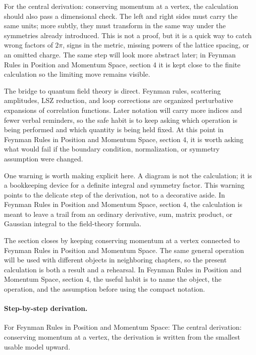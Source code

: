 For the central derivation: conserving momentum at a vertex, the calculation should also pass a dimensional check.  The left and right sides must carry the same units; more subtly, they must transform in the same way under the symmetries already introduced.  This is not a proof, but it is a quick way to catch wrong factors of \(2\pi\), signs in the metric, missing powers of the lattice spacing, or an omitted charge.  The same step will look more abstract later; in Feynman Rules in Position and Momentum Space, section 4 it is kept close to the finite calculation so the limiting move remains visible.

The bridge to quantum field theory is direct.  Feynman rules, scattering amplitudes, LSZ reduction, and loop corrections are organized perturbative expansions of correlation functions.  Later notation will carry more indices and fewer verbal reminders, so the safe habit is to keep asking which operation is being performed and which quantity is being held fixed.  At this point in Feynman Rules in Position and Momentum Space, section 4, it is worth asking what would fail if the boundary condition, normalization, or symmetry assumption were changed.

One warning is worth making explicit here.  A diagram is not the calculation; it is a bookkeeping device for a definite integral and symmetry factor.  This warning points to the delicate step of the derivation, not to a decorative aside.  In Feynman Rules in Position and Momentum Space, section 4, the calculation is meant to leave a trail from an ordinary derivative, sum, matrix product, or Gaussian integral to the field-theory formula.

The section closes by keeping conserving momentum at a vertex connected to Feynman Rules in Position and Momentum Space.  The same general operation will be used with different objects in neighboring chapters, so the present calculation is both a result and a rehearsal.  In Feynman Rules in Position and Momentum Space, section 4, the useful habit is to name the object, the operation, and the assumption before using the compact notation.



\paragraph{Step-by-step derivation.}

For Feynman Rules in Position and Momentum Space: The central derivation: conserving momentum at a vertex, the derivation is written from the smallest usable model upward.

